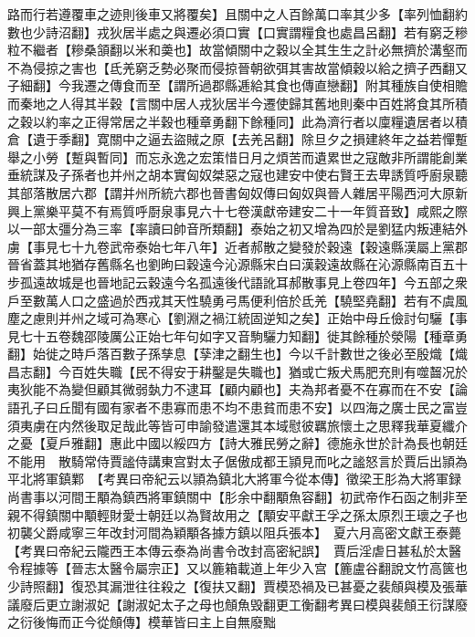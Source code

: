路而行若遵覆車之迹則後車又將覆矣】且關中之人百餘萬口率其少多【率列恤翻約數也少詩沼翻】戎狄居半處之與遷必須口實【口實謂糧食也處昌呂翻】若有窮乏糝粒不繼者【糝桑頷翻以米和羮也】故當傾關中之穀以全其生生之計必無擠於溝壑而不為侵掠之害也【氐羌窮乏勢必聚而侵掠晉朝欲弭其害故當傾穀以給之擠子西翻又子細翻】今我遷之傳食而至【謂所過郡縣逓給其食也傳直戀翻】附其種族自使相贍而秦地之人得其半穀【言關中居人戎狄居半今遷使歸其舊地則秦中百姓將食其所積之穀以約率之正得常居之半穀也種章勇翻下餘種同】此為濟行者以廩糧遺居者以積倉【遺于季翻】寛關中之逼去盜賊之原【去羌呂翻】除旦夕之損建終年之益若憚蹔舉之小勞【蹔與暫同】而忘永逸之宏策惜日月之煩苦而遺累世之寇敵非所謂能創業垂統謀及子孫者也并州之胡本實匈奴桀惡之寇也建安中使右賢王去卑誘質呼廚泉聽其部落散居六郡【謂并州所統六郡也晉書匈奴傳曰匈奴與晉人雜居平陽西河大原新興上黨樂平莫不有焉質呼㕑泉事見六十七卷漢獻帝建安二十一年質音致】咸熙之際以一部太彊分為三率【率讀曰帥音所類翻】泰始之初又增為四於是劉猛内叛連結外虜【事見七十九卷武帝泰始七年八年】近者郝散之變發於穀遠【穀遠縣漢屬上黨郡晉省蓋其地猶存舊縣名也劉昫曰穀遠今沁源縣宋白曰漢穀遠故縣在沁源縣南百五十步孤遠故城是也晉地記云穀遠今名孤遠後代語訛耳郝散事見上卷四年】今五部之衆戶至數萬人口之盛過於西戎其天性驍勇弓馬便利倍於氐羌【驍堅堯翻】若有不虞風塵之慮則并州之域可為寒心【劉淵之禍江統固逆知之矣】正始中母丘儉討句驪【事見七十五卷魏邵陵厲公正始七年句如字又音駒驪力知翻】徙其餘種於滎陽【種章勇翻】始徙之時戶落百數子孫孳息【孶津之翻生也】今以千計數世之後必至殷熾【熾昌志翻】今百姓失職【民不得安于耕鑿是失職也】猶或亡叛犬馬肥充則有噬齧况於夷狄能不為變但顧其微弱埶力不逮耳【顧内顧也】夫為邦者憂不在寡而在不安【論語孔子曰丘聞有國有家者不患寡而患不均不患貧而患不安】以四海之廣士民之富豈須夷虜在内然後取足哉此等皆可申諭發遣還其本域慰彼羈旅懷土之思釋我華夏纖介之憂【夏戶雅翻】惠此中國以綏四方【詩大雅民勞之辭】德施永世於計為長也朝廷不能用　散騎常侍賈謐侍講東宫對太子倨傲成都王頴見而叱之謐怒言於賈后出頴為平北將軍鎮鄴　【考異曰帝紀云以頴為鎮北大將軍今從本傳】徵梁王肜為大將軍録尚書事以河間王顒為鎮西將軍鎮關中【肜余中翻顒魚容翻】初武帝作石函之制非至親不得鎮關中顒輕財愛士朝廷以為賢故用之【顒安平獻王孚之孫太原烈王瓌之子也初襲父爵咸寧三年改封河間為穎顒各據方鎮以阻兵張本】　夏六月高密文獻王泰薨　【考異曰帝紀云隴西王本傳云泰為尚書令改封高密紀誤】　賈后淫虐日甚私於太醫令程據等【晉志太醫令屬宗正】又以簏箱載道上年少入宫【簏盧谷翻說文竹高篋也少詩照翻】復恐其漏泄往往殺之【復扶又翻】賈模恐禍及已甚憂之裴頠與模及張華議廢后更立謝淑妃【謝淑妃太子之母也頠魚毁翻更工衡翻考異曰模與裴頠王衍謀廢之衍後悔而正今從頠傳】模華皆曰主上自無廢黜

